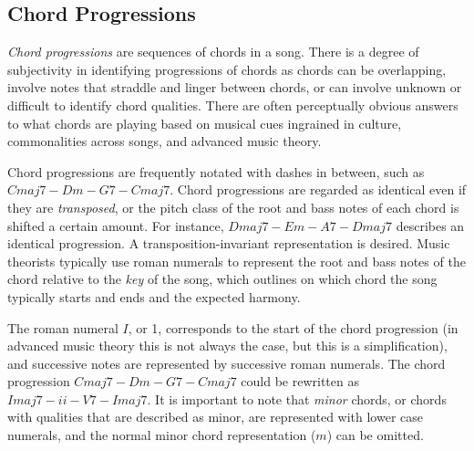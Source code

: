 \subsection{Chord Progressions}

\textit{Chord progressions} are sequences of chords in a song. There is a degree of subjectivity in identifying progressions of chords as chords can be overlapping, involve notes that straddle and linger between chords, or can involve unknown or difficult to identify chord qualities. There are often perceptually obvious answers to what chords are playing based on musical cues ingrained in culture, commonalities across songs, and advanced music theory.

Chord progressions are frequently notated with dashes in between, such as $Cmaj7 - Dm - G7 - Cmaj7$. Chord progressions are regarded as identical even if they are \textit{transposed}, or the pitch class of the root and bass notes of each chord is shifted a certain amount. For instance, $Dmaj7 - Em - A7 - Dmaj7$ describes an identical progression. A transposition-invariant representation is desired. Music theorists typically use roman numerals to represent the root and bass notes of the chord relative to the \textit{key} of the song, which outlines on which chord the song typically starts and ends and the expected harmony.

The roman numeral $I$, or 1, corresponds to the start of the chord progression (in advanced music theory this is not always the case, but this is a simplification), and successive notes are represented by successive roman numerals. The chord progression $Cmaj7 - Dm - G7 - Cmaj7$ could be rewritten as $Imaj7 - ii - V7 - Imaj7$. It is important to note that \textit{minor} chords, or chords with qualities that are described as minor, are represented with lower case numerals, and the normal minor chord representation ($m$) can be omitted.